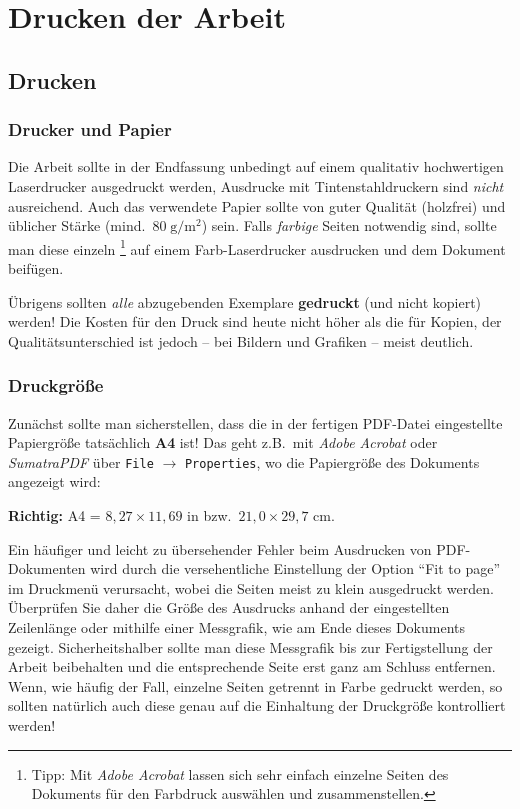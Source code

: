 \chapter{Drucken der Arbeit}
\label{chap:Drucken}

\section{Drucken}

\subsection{Drucker und Papier}

Die Arbeit sollte in der Endfassung unbedingt auf einem
qualitativ hochwertigen Laserdrucker ausgedruckt werden, Ausdrucke
mit Tintenstahldruckern sind \emph{nicht} ausreichend. Auch das
verwendete Papier sollte von guter Qualität (holzfrei) und
üblicher Stärke (mind.\ $80\; {\mathrm g} / {\mathrm m}^2$) sein.
Falls \emph{farbige} Seiten notwendig sind, sollte man diese einzeln%
\footnote{Tipp: Mit \emph{Adobe Acrobat} lassen sich sehr einfach einzelne Seiten
des Dokuments für den Farbdruck auswählen und zusammenstellen.}
auf einem Farb-Laserdrucker ausdrucken und dem Dokument beifügen.

Übrigens sollten \emph{alle} abzugebenden Exemplare {\bf
gedruckt} (und nicht kopiert) werden! Die Kosten für den Druck
sind heute nicht höher als die für Kopien, der
Qualitätsunterschied ist jedoch --  bei Bildern und Grafiken
-- meist deutlich.


\subsection{Druckgröße}

Zunächst sollte man sicherstellen, dass die in der fertigen PDF-Datei eingestellte
Papiergröße tatsächlich \textbf{A4} ist! Das geht z.B.\ mit \emph{Adobe Acrobat}
oder \emph{SumatraPDF}
über \texttt{File} $\rightarrow$ \texttt{Properties},
wo die Papiergröße des Dokuments angezeigt wird:
\begin{center}
\textbf{Richtig:} A4 = $8{,}27 \times 11{,}69$ in bzw.\ $21{,}0 \times 29{,}7$ cm.
\end{center}

Ein häufiger und leicht zu übersehender Fehler beim Ausdrucken von
PDF-Dokumenten wird durch die versehentliche Einstellung der
Option "`Fit to page"' im Druckmenü verursacht, wobei die Seiten
meist zu klein ausgedruckt werden. Überprüfen Sie daher die Größe
des Ausdrucks anhand der eingestellten Zeilenlänge oder mithilfe
einer Messgrafik, wie am Ende dieses Dokuments gezeigt.
Sicherheitshalber sollte man diese Messgrafik bis zur
Fertigstellung der Arbeit beibehalten und die entsprechende
Seite erst ganz am Schluss entfernen.
Wenn, wie häufig der Fall, einzelne Seiten getrennt in Farbe gedruckt 
werden, so sollten natürlich auch diese genau auf die Einhaltung der Druckgröße 
kontrolliert werden!




